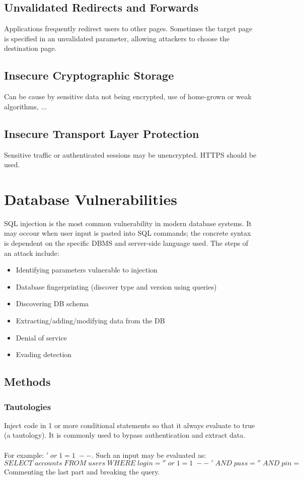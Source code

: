 \documentclass[10pt,a4paper]{report}
\begin{document}
\subsection{Unvalidated Redirects and Forwards}
Applications frequently redirect users to other pages. Sometimes the target page is specified in an unvalidated parameter, allowing attackers to choose the destination page.
\subsection{Insecure Cryptographic Storage}
Can be cause by sensitive data not being encrypted, use of home-grown or weak algorithms, ...
\subsection{Insecure Transport Layer Protection}
Sensitive traffic or authenticated sessions may be unencrypted. HTTPS should be used.

\section{Database Vulnerabilities}
SQL injection is the most common vulnerability in modern database systems. It may occour when user input is pasted into SQL commands; the concrete syntax is dependent on the specific DBMS and server-side language used. The steps of an attack include:
\begin{itemize}
\item Identifying parameters vulnerable to injection
\item Database fingerprinting (discover type and version using queries)
\item Discovering DB schema
\item Extracting/adding/modifying data from the DB
\item Denial of service
\item Evading detection
\end{itemize}
\subsection{Methods}
\subsubsection{Tautologies}
Inject code in 1 or more conditional statements so that it always evaluate to true (a tautology). It is commonly used to bypass authentication and extract data.\\
\\
For example: $' \; or \; 1=1 \; -- $. Such an input may be evaluated as: $$SELECT \; accounts \; FROM \; users \; WHERE \; login='' \; or \; 1=1 \; -- \; ' \; AND \; pass='' \; AND \; pin=$$
Commenting the last part and breaking the query.
\end{document}
